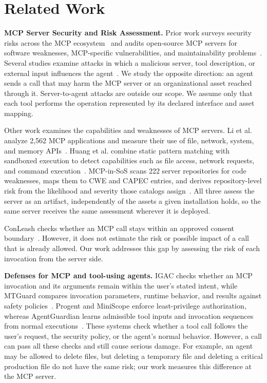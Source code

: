 \documentclass[sigconf]{acmart}
\begin{document}
\section{Related Work}
\label{sec:related}

\textbf{MCP Server Security and Risk Assessment.}
Prior work surveys security risks across the MCP
ecosystem~\cite{hou2026mcp} and audits open-source MCP servers for
software weaknesses, MCP-specific vulnerabilities, and maintainability
problems~\cite{hasan2025firstglance}. Several studies examine attacks in which
a malicious server, tool description, or external input influences the
agent~\cite{invariant2025toolpoisoning,shi2025toolhijacker,
zhao2025parasites}. We study the opposite direction: an agent sends a call that
may harm the MCP server or an organizational asset reached through it.
Server-to-agent attacks are outside our scope. We assume only that each tool
performs the operation represented by its declared interface and asset
mapping.

Other work examines the capabilities and weaknesses of MCP servers. Li et al.
analyze 2,562 MCP applications and measure their use of file, network, system,
and memory APIs~\cite{li2025privilege}. Huang et al. combine static pattern
matching with sandboxed execution to detect capabilities such as file access,
network requests, and command execution~\cite{huang2026auditing}. MCP-in-SoS
scans 222 server repositories for code weaknesses, maps them to CWE and CAPEC
entries, and derives repository-level risk from the likelihood and severity
those catalogs assign~\cite{kumar2026mcpinsos}. All three assess the server as
an artifact, independently of the assets a given installation holds, so the
same server receives the same assessment wherever it is deployed.

ConLeash checks whether an MCP call stays within an approved consent boundary~\cite{li2026conleash}. However, it does not estimate the risk or possible impact of a call that is already allowed. Our work addresses this gap by assessing the risk of each invocation from the server side.




\textbf{Defenses for MCP and tool-using agents.}
IGAC checks whether an MCP invocation and its arguments remain within the user's stated intent, while MTGuard compares invocation parameters, runtime behavior, and results against safety policies~\cite{zhu2026igac,he2026mtguard}. Progent and MiniScope enforce least-privilege authorization, whereas AgentGuardian learns admissible tool inputs and invocation sequences from normal executions~\cite{shi2025progent,zhu2025miniscope,abaev2026agentguardian}. These systems check whether a tool call follows the user's request, the security policy, or the agent's normal behavior. However, a call can pass all these checks and still cause serious damage. For example, an agent may be allowed to delete files, but deleting a temporary file and deleting a critical production file do not have the same risk; our work measures this difference at the MCP server.
\end{document}
